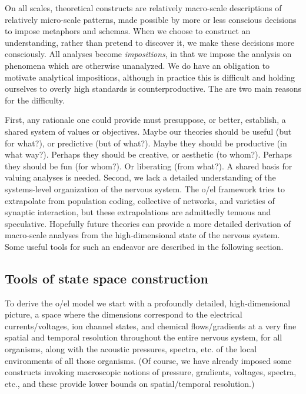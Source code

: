   On all scales, theoretical constructs are relatively macro-scale descriptions of relatively micro-scale patterns, made possible by more or less conscious decisions to impose metaphors and schemas. When we choose to construct an understanding, rather than pretend to discover it, we make these decisions more consciously. All analyses become \textit{impositions}, in that we impose the analysis on phenomena which are otherwise unanalyzed. We do have an obligation to motivate analytical impositions, although in practice this is difficult and holding ourselves to overly high standards is counterproductive. The are two main reasons for the difficulty. 

  First, any rationale one could provide must presuppose, or better, establish, a shared system of values or objectives. Maybe our theories should be useful (but for what?), or predictive (but of what?). Maybe they should be productive (in what way?). Perhaps they should be creative, or aesthetic (to whom?). Perhaps they should be fun (for whom?). Or liberating (from what?). A shared basis for valuing analyses is needed. Second, we lack a detailed understanding of the systems-level organization of the nervous system. The o/el framework tries to extrapolate from population coding, collective  of networks, and varieties of synaptic interaction, but these extrapolations are admittedly tenuous and speculative. Hopefully future theories can provide a more detailed derivation of macro-scale analyses from the high-dimensional state of the nervous system. Some useful tools for such an endeavor are described in the following section.

\subsection{Tools of state space construction}

To derive the o/el model we start with a profoundly detailed, high-dimensional picture, a space where the dimensions correspond to the electrical currents/voltages, ion channel states, and chemical flows/gradients at a very fine spatial and temporal resolution throughout the entire nervous system, for all organisms, along with the acoustic pressures, spectra, etc. of the local environments of all those organisms. (Of course, we have already imposed some constructs invoking macroscopic notions of pressure, gradients, voltages, spectra, etc., and these provide lower bounds on spatial/temporal resolution.) 

